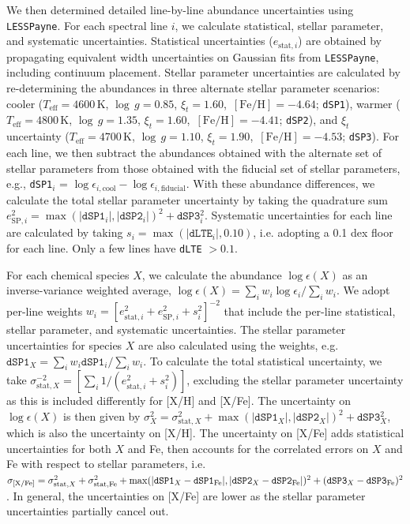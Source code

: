 \documentclass{natureprintstyle}
\newcommand{\code}[1]{\texttt{#1}\xspace}
\newcommand{\unit}[1]{\ensuremath{\mathrm{\,#1}}\xspace}
\newcommand{\feh}{\unit{[Fe/H]}}
\newcommand{\teff}{\ensuremath{T_\mathrm{eff}}\xspace}
\newcommand{\Teff}{\teff}
\newcommand{\logg}{\ensuremath{\log\,g}\xspace}
\begin{document}
We then determined detailed line-by-line abundance uncertainties using \code{LESSPayne}.
For each spectral line $i$, we calculate statistical, stellar parameter, and systematic uncertainties.
Statistical uncertainties ($e_{\text{stat}, i}$) are obtained by propagating equivalent width uncertainties on Gaussian fits from \code{LESSPayne}, including continuum placement\cite{Ji2020b}.
Stellar parameter uncertainties are calculated by re-determining the abundances in three alternate stellar parameter scenarios: 
cooler ($\Teff=4600$\,K, $\logg=0.85$, $\xi_t=1.60$, $\feh=-4.64$; \code{dSP1}), 
warmer ($\Teff=4800$\,K, $\logg=1.35$, $\xi_t=1.60$, $\feh=-4.41$; \code{dSP2}), and 
$\xi_t$ uncertainty ($\Teff=4700$\,K, $\logg=1.10$, $\xi_t=1.90$, $\feh=-4.53$; \code{dSP3}).
For each line, we then subtract the abundances obtained with the alternate set of stellar parameters from those obtained with the fiducial set of stellar parameters, 
e.g., \code{dSP1}{$_i$} = $\log \epsilon_{i, \text{cool}} - \log \epsilon_{i, \text{fiducial}}$. 
With these abundance differences, we calculate the total stellar parameter uncertainty by taking the quadrature sum $e_{\text{SP},i}^2 = \max(|\code{dSP1}_i|, |\code{dSP2}_i|)^2 + \code{dSP3}_i^2$.
Systematic uncertainties for each line are calculated by taking $s_i = \max(|\code{dLTE}_i|, 0.10)$, i.e. adopting a 0.1 dex floor for each line. Only a few lines have \code{dLTE} $> 0.1$.

For each chemical species $X$, we calculate the abundance $\log \epsilon(X)$ as an inverse-variance weighted average, $\log\epsilon(X) = \sum_i w_i \log\epsilon_i/\sum_i w_i$.
We adopt per-line weights $w_i = \left[e_{\text{stat},i}^2 + e_{\text{SP},i}^2 + s_i^2\right]^{-2}$ that include the per-line statistical, stellar parameter, and systematic uncertainties.
The stellar parameter uncertainties for species $X$ are also calculated using the weights, e.g. $\code{dSP1}_X = \sum_i w_i \code{dSP1}_i/\sum_i w_i$.
To calculate the total statistical uncertainty, we take $\sigma_{\text{stat},X}^{-2} = \left[\sum_i 1/(e_{\text{stat},i}^2 + s_i^2) \right]$, excluding the stellar parameter uncertainty as this is included differently for [X/H] and [X/Fe].
The uncertainty on $\log\epsilon(X)$ is then given by $\sigma_{X}^2 = \sigma_{\text{stat},X}^2 + \max(|\code{dSP1}_X|, |\code{dSP2}_X|)^2 + \code{dSP3}_X^2$, which is also the uncertainty on [X/H].
The uncertainty on [X/Fe] adds statistical uncertainties for both $X$ and Fe, then accounts for the correlated errors on $X$ and Fe with respect to stellar parameters, i.e. $\sigma_{\text{[X/Fe]}} = \sigma_{\text{stat},X}^2 + \sigma_{\text{stat},\text{Fe}}^2 + \max(|\code{dSP1}_X - \code{dSP1}_{\rm Fe}|, |\code{dSP2}_X - \code{dSP2}_{\rm Fe}|)^2 + (\code{dSP3}_X - \code{dSP3}_{\rm Fe})^2$.
In general, the uncertainties on [X/Fe] are lower as the stellar parameter uncertainties partially cancel out.
\end{document}
